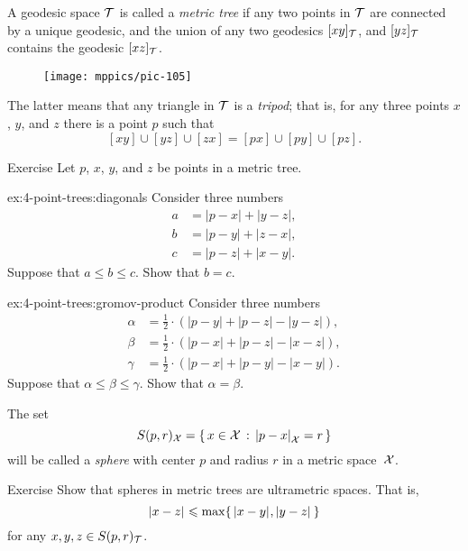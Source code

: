 A geodesic space $\mathcal{T}$ is called a \emph{metric tree} if any two points in $\mathcal{T}$ are connected by a unique geodesic,
and the union of any two geodesics $[xy]_{\mathcal{T}}$, and $[yz]_{\mathcal{T}}$ contains the geodesic $[xz]_{\mathcal{T}}$.

{

\begin{wrapfigure}{r}{25 mm}
\vskip-6mm
\centering
\texttt{[image: mppics/pic-105]}
\end{wrapfigure}

The latter means that any triangle in $\mathcal{T}$ is a \emph{tripod};
that is, for any three points $x$, $y$, and $z$ there is a point $p$ such that 
\[[xy]\cup[yz]\cup[zx]=[px]\cup[py]\cup[pz].\]

}

\begin{thm}{Exercise}\label{ex:4-point-trees}
Let $p$, $x$, $y$, and $z$ be points in a metric tree.

\begin{subthm}{ex:4-point-trees:diagonals}
Consider three numbers 
\begin{align*}
a&=|p-x|+|y-z|,
\\
b&=|p-y|+|z-x|,
\\
c&=|p-z|+|x-y|.
\end{align*}
Suppose that $a\le b\le c$.
Show that $b=c$.
\end{subthm}

\begin{subthm}{ex:4-point-trees:gromov-product}
Consider three numbers 
\begin{align*}
\alpha&=\tfrac12\cdot(|p-y|+|p-z|-|y-z|),
\\
\beta &=\tfrac12\cdot(|p-x|+|p-z|-|x-z|),
\\
\gamma&=\tfrac12\cdot(|p-x|+|p-y|-|x-y|).
\end{align*}
Suppose that $\alpha\le \beta\le \gamma$.
Show that $\alpha=\beta$.
\end{subthm}

\end{thm}

The set 
\[S(p,r)_{\spc{X}}=\set{x\in\spc{X}}{\dist{p}{x}{\spc{X}}=r}\]
will be called a \emph{sphere} with center $p$ and radius $r$ in a metric space~$\mathcal{X}$.


\begin{thm}{Exercise}\label{ex:spheres-in-trees}
Show that spheres in metric trees are ultrametric spaces.
That is, 
\[\dist{x}{z}{}
\le
\max\{\,\dist{x}{y}{},\dist{y}{z}{}\,\}\]
for any $x,y,z\in S(p,r)_{\mathcal{T}}$.
\end{thm}

